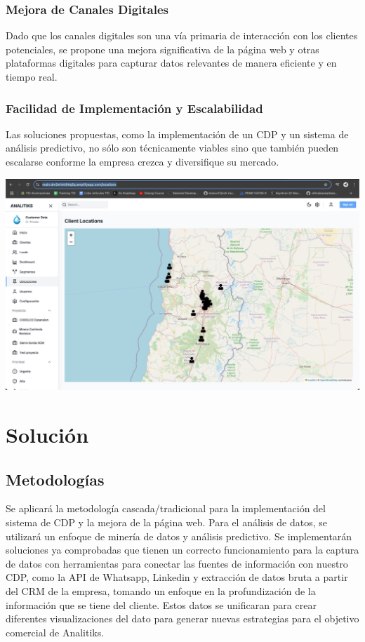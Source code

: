 \documentclass[12pt]{article}
\begin{document}
\subsubsection{Mejora de Canales Digitales}
\noindent
Dado que los canales digitales son una vía primaria de interacción con los clientes potenciales, se propone una mejora significativa de la página web y otras plataformas digitales para capturar datos relevantes de manera eficiente y en tiempo real.

\subsubsection{Facilidad de Implementación y Escalabilidad}
\noindent
Las soluciones propuestas, como la implementación de un CDP y un sistema de análisis predictivo, no sólo son técnicamente viables sino que también pueden escalarse conforme la empresa crezca y diversifique su mercado.

\begin{center}
    \includegraphics[width=19cm]{imagen33.jpeg}
\end{center}


\newpage

\section{Solución}

\subsection{Metodologías}
\noindent
Se aplicará la metodología cascada/tradicional para la implementación del sistema de CDP y la mejora de la página web. Para el análisis de datos, se utilizará un enfoque de minería de datos y análisis predictivo. Se implementarán soluciones ya comprobadas que tienen un correcto funcionamiento para la captura de datos con herramientas para conectar las fuentes de información con nuestro CDP, como la API de Whatsapp, Linkedin y extracción de datos bruta a partir del CRM de la empresa, tomando un enfoque en la profundización de la información que se tiene del cliente. Estos datos se unificaran para crear diferentes visualizaciones del dato para generar nuevas estrategias para el objetivo comercial de Analitiks.
\end{document}
